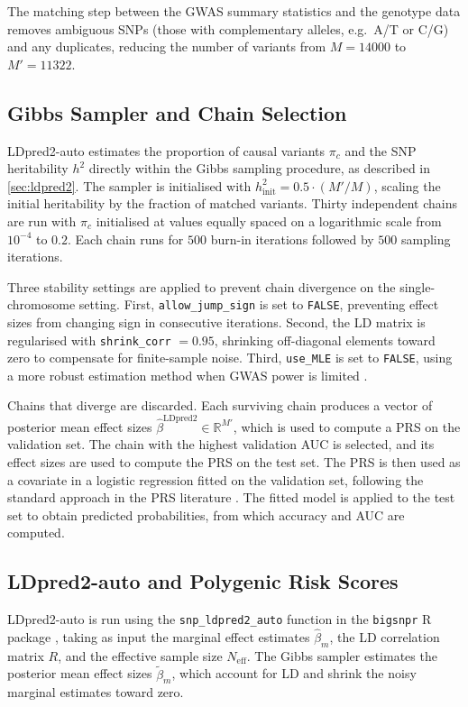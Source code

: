 The matching step between the GWAS summary statistics and the genotype data removes ambiguous SNPs (those with complementary alleles, e.g.\ A/T or C/G) and any duplicates, reducing the number of variants from $M = 14000$ to $M' = 11322$.

\subsection{Gibbs Sampler and Chain Selection}

LDpred2-auto estimates the proportion of causal variants $\pi_c$ and the SNP heritability $h^2$ directly within the Gibbs sampling procedure, as described in \autoref{sec:ldpred2}. The sampler is initialised with $h^2_{\text{init}} = 0.5 \cdot (M' / M)$, scaling the initial heritability by the fraction of matched variants. Thirty independent chains are run with $\pi_c$ initialised at values equally spaced on a logarithmic scale from $10^{-4}$ to $0.2$. Each chain runs for $500$ burn-in iterations followed by $500$ sampling iterations.

Three stability settings are applied to prevent chain divergence on the single-chromosome setting. First, \texttt{allow\_jump\_sign} is set to \texttt{FALSE}, preventing effect sizes from changing sign in consecutive iterations. Second, the LD matrix is regularised with \texttt{shrink\_corr} $= 0.95$, shrinking off-diagonal elements toward zero to compensate for finite-sample noise. Third, \texttt{use\_MLE} is set to \texttt{FALSE}, using a more robust estimation method when GWAS power is limited \citep{Prive2020}.

Chains that diverge are discarded. Each surviving chain produces a vector of posterior mean effect sizes $\hat{\beta}^{\text{LDpred2}} \in \mathbb{R}^{M'}$, which is used to compute a PRS on the validation set. The chain with the highest validation AUC is selected, and its effect sizes are used to compute the PRS on the test set. The PRS is then used as a covariate in a logistic regression fitted on the validation set, following the standard approach in the PRS literature \citep{Choi2020}. The fitted model is applied to the test set to obtain predicted probabilities, from which accuracy and AUC are computed.

\subsection{LDpred2-auto and Polygenic Risk Scores}
LDpred2-auto is run using the \texttt{snp\_ldpred2\_auto} function in
the \texttt{bigsnpr} R package \citep{Prive2020}, taking as input the
marginal effect estimates $\hat{\beta}_m$, the LD correlation matrix $R$,
and the effective sample size $N_{\text{eff}}$. The Gibbs sampler
estimates the posterior mean effect sizes $\tilde{\beta}_m$, which
account for LD and shrink the noisy marginal estimates toward zero.

